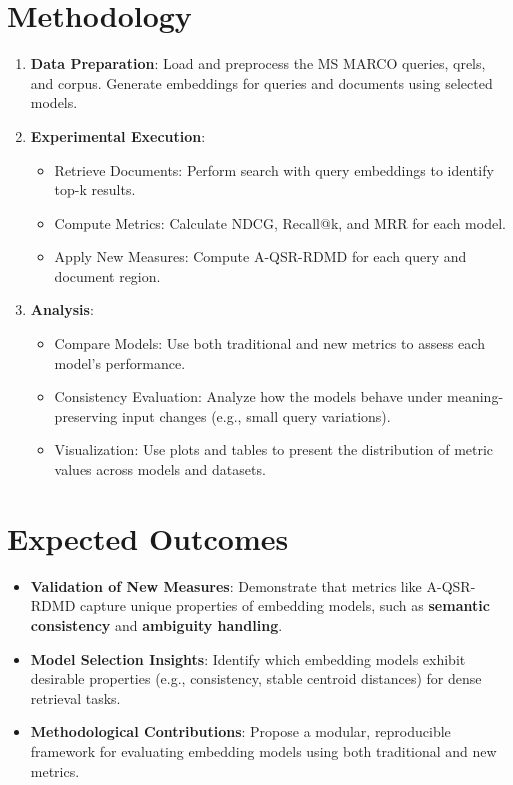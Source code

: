 \documentclass{article}
\begin{document}
\section{Methodology}
\begin{enumerate}
    \item \textbf{Data Preparation}: 
    Load and preprocess the MS MARCO queries, qrels, and corpus. 
    Generate embeddings for queries and documents using selected models.
    \item \textbf{Experimental Execution}:
    \begin{itemize}
        \item Retrieve Documents: Perform search with query embeddings to identify top-k results.
        \item Compute Metrics: Calculate NDCG, Recall@k, and MRR for each model.
        \item Apply New Measures: Compute A-QSR-RDMD for each query and document region.
    \end{itemize}
    \item \textbf{Analysis}:
    \begin{itemize}
        \item Compare Models: Use both traditional and new metrics to assess each model’s performance.
        \item Consistency Evaluation: Analyze how the models behave under meaning-preserving input changes (e.g., small query variations).
        \item Visualization: Use plots and tables to present the distribution of metric values across models and datasets.
    \end{itemize}
\end{enumerate}

\section{Expected Outcomes}
\begin{itemize}
    \item \textbf{Validation of New Measures}: Demonstrate that metrics like A-QSR-RDMD capture unique properties of embedding models, such as \textbf{semantic consistency} and \textbf{ambiguity handling}.
    \item \textbf{Model Selection Insights}: Identify which embedding models exhibit desirable properties (e.g., consistency, stable centroid distances) for dense retrieval tasks.
    \item \textbf{Methodological Contributions}: Propose a modular, reproducible framework for evaluating embedding models using both traditional and new metrics.
\end{itemize}
\end{document}
